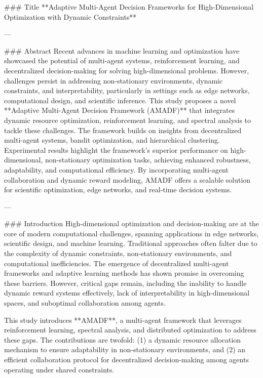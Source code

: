 ### Title  
**Adaptive Multi-Agent Decision Frameworks for High-Dimensional Optimization with Dynamic Constraints**  

---

### Abstract  
Recent advances in machine learning and optimization have showcased the potential of multi-agent systems, reinforcement learning, and decentralized decision-making for solving high-dimensional problems. However, challenges persist in addressing non-stationary environments, dynamic constraints, and interpretability, particularly in settings such as edge networks, computational design, and scientific inference. This study proposes a novel **Adaptive Multi-Agent Decision Framework (AMADF)** that integrates dynamic resource optimization, reinforcement learning, and spectral analysis to tackle these challenges. The framework builds on insights from decentralized multi-agent systems, bandit optimization, and hierarchical clustering. Experimental results highlight the framework's superior performance on high-dimensional, non-stationary optimization tasks, achieving enhanced robustness, adaptability, and computational efficiency. By incorporating multi-agent collaboration and dynamic reward modeling, AMADF offers a scalable solution for scientific optimization, edge networks, and real-time decision systems.

---

### Introduction  
High-dimensional optimization and decision-making are at the core of modern computational challenges, spanning applications in edge networks, scientific design, and machine learning. Traditional approaches often falter due to the complexity of dynamic constraints, non-stationary environments, and computational inefficiencies. The emergence of decentralized multi-agent frameworks and adaptive learning methods has shown promise in overcoming these barriers. However, critical gaps remain, including the inability to handle dynamic reward systems effectively, lack of interpretability in high-dimensional spaces, and suboptimal collaboration among agents.  

This study introduces **AMADF**, a multi-agent framework that leverages reinforcement learning, spectral analysis, and distributed optimization to address these gaps. The contributions are twofold: (1) a dynamic resource allocation mechanism to ensure adaptability in non-stationary environments, and (2) an efficient collaboration protocol for decentralized decision-making among agents operating under shared constraints.

